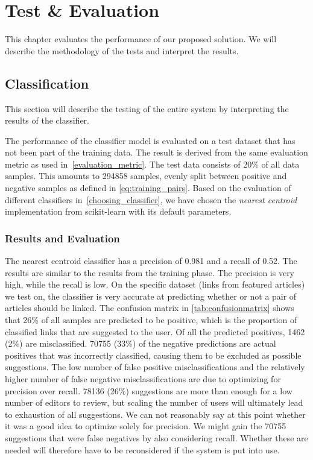 \chapter{Test \& Evaluation}\label{chap:testeval}
This chapter evaluates the performance of our proposed solution. We will describe the methodology of the tests and interpret the results.

\section{Classification}\label{sec:classification_evaluation}
This section will describe the testing of the entire system by interpreting the results of the classifier.

The performance of the classifier model is evaluated on a test dataset that has not been part of the training data. The result is derived from the same evaluation metric as used in~\cref{evaluation_metric}. The test data consists of 20\% of all data samples. This amounts to \num{294858} samples, evenly split between positive and negative samples as defined in \cref{eq:training_pairs}. Based on the evaluation of different classifiers in~\cref{choosing_classifier}, we have chosen the \emph{nearest centroid} implementation from scikit-learn with its default parameters.

\subsection{Results and Evaluation}
The nearest centroid classifier has a precision of \num{0.981} and a recall of \num{0.52}. The results are similar to the results from the training phase. The precision is very high, while the recall is low. On the specific dataset (links from featured articles) we test on, the classifier is very accurate at predicting whether or not a pair of articles should be linked. The confusion matrix in \cref{tab:confusionmatrix} shows that 26\% of all samples are predicted to be positive, which is the proportion of classified links that are suggested to the user.  Of all the predicted positives, \num{1462} (2\%) are misclassified. \num{70755} (33\%) of the negative predictions are actual positives that was incorrectly classified, causing them to be excluded as possible suggestions. The low number of false positive misclassifications and the relatively higher number of false negative misclassifications are due to optimizing for precision over recall.  \num{78136} (26\%) suggestions are more than enough for a low number of editors to review, but scaling the number of users will ultimately lead to exhaustion of all suggestions. We can not reasonably say at this point whether it was a good idea to optimize solely for precision. We might gain the \num{70755} suggestions that were false negatives by also considering recall. Whether these are needed will therefore have to be reconsidered if the system is put into use.

